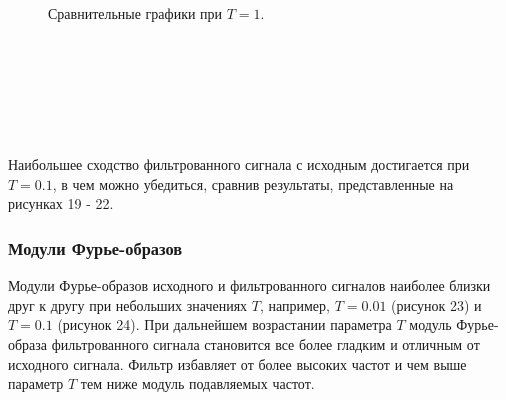 \documentclass[a5paper, 10pt]{article}
\theoremstyle{definition}
\theoremstyle{plain}
\theoremstyle{remark}
\begin{document}
\begin{figure}[h!]
\caption{Сравнительные графики при $T = 1$.}
\end{figure}
\, \\
\\
\\
\\
\\
\\
Наибольшее сходство фильтрованного сигнала с исходным достигается при $T=0.1$, в чем можно убедиться, сравнив результаты, представленные на рисунках 19 - 22.\\
\subsubsection{Модули Фурье-образов}
Модули Фурье-образов исходного и фильтрованного сигналов наиболее близки друг к другу при небольших значениях $T$, например, $T=0.01$ (рисунок 23) и $T=0.1$ (рисунок 24). При дальнейшем возрастании параметра $T$ модуль Фурье-образа фильтрованного сигнала становится все более гладким и отличным от исходного сигнала. Фильтр избавляет от более высоких частот и чем выше параметр $T$ тем ниже модуль подавляемых частот.
\end{document}
